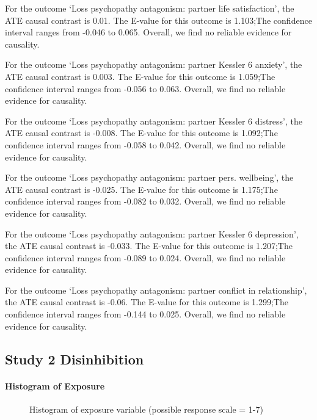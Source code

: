\documentclass[
  singlecolumn]{article}
\let\oldparagraph\paragraph
\renewcommand{\paragraph}[1]{\oldparagraph{#1}\mbox{}}
\begin{document}
For the outcome `Loss psychopathy antagonism: partner life
satisfaction', the ATE causal contrast is 0.01. The E-value for this
outcome is 1.103;The confidence interval ranges from -0.046 to 0.065.
Overall, we find no reliable evidence for causality.

For the outcome `Loss psychopathy antagonism: partner Kessler 6
anxiety', the ATE causal contrast is 0.003. The E-value for this outcome
is 1.059;The confidence interval ranges from -0.056 to 0.063. Overall,
we find no reliable evidence for causality.

For the outcome `Loss psychopathy antagonism: partner Kessler 6
distress', the ATE causal contrast is -0.008. The E-value for this
outcome is 1.092;The confidence interval ranges from -0.058 to 0.042.
Overall, we find no reliable evidence for causality.

For the outcome `Loss psychopathy antagonism: partner pers. wellbeing',
the ATE causal contrast is -0.025. The E-value for this outcome is
1.175;The confidence interval ranges from -0.082 to 0.032. Overall, we
find no reliable evidence for causality.

For the outcome `Loss psychopathy antagonism: partner Kessler 6
depression', the ATE causal contrast is -0.033. The E-value for this
outcome is 1.207;The confidence interval ranges from -0.089 to 0.024.
Overall, we find no reliable evidence for causality.

For the outcome `Loss psychopathy antagonism: partner conflict in
relationship', the ATE causal contrast is -0.06. The E-value for this
outcome is 1.299;The confidence interval ranges from -0.144 to 0.025.
Overall, we find no reliable evidence for causality.

\subsection{Study 2 Disinhibition}\label{study-2-disinhibition}

\paragraph{Histogram of Exposure}\label{histogram-of-exposure-1}

\begin{figure}


\caption{\label{fig-histogram-disinhibition}Histogram of exposure
variable (possible response scale = 1-7)}

\end{figure}%
\end{document}
